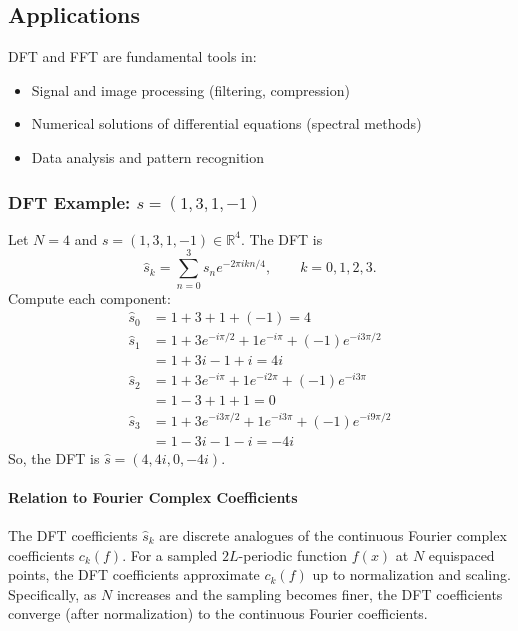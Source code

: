 \subsection{Applications}
DFT and FFT are fundamental tools in:
\begin{itemize}
    \item Signal and image processing (filtering, compression)
    \item Numerical solutions of differential equations (spectral methods)
    \item Data analysis and pattern recognition
\end{itemize}


\subsubsection*{DFT Example: $s = (1, 3, 1, -1)$}

Let $N = 4$ and $s = (1, 3, 1, -1) \in \mathbb{R}^4$. The DFT is
\[
    \hat{s}_k = \sum_{n=0}^{3} s_n e^{-2\pi i k n / 4}, \qquad k = 0,1,2,3.
\]
Compute each component:
\begin{align*}
    \hat{s}_0 & = 1 + 3 + 1 + (-1) = 4                                  \\
    \hat{s}_1 & = 1 + 3 e^{-i\pi/2} + 1 e^{-i\pi} + (-1) e^{-i3\pi/2}   \\
              & = 1 + 3i - 1 + i = 4i                                   \\
    \hat{s}_2 & = 1 + 3 e^{-i\pi} + 1 e^{-i2\pi} + (-1) e^{-i3\pi}      \\
              & = 1 - 3 + 1 + 1 = 0                                     \\
    \hat{s}_3 & = 1 + 3 e^{-i3\pi/2} + 1 e^{-i3\pi} + (-1) e^{-i9\pi/2} \\
              & = 1 - 3i - 1 - i = -4i
\end{align*}
So, the DFT is $\hat{s} = (4, 4i, 0, -4i)$.

\paragraph{Relation to Fourier Complex Coefficients}
The DFT coefficients $\hat{s}_k$ are discrete analogues of the continuous Fourier complex coefficients $c_k(f)$. For a sampled $2L$-periodic function $f(x)$ at $N$ equispaced points, the DFT coefficients approximate $c_k(f)$ up to normalization and scaling. Specifically, as $N$ increases and the sampling becomes finer, the DFT coefficients converge (after normalization) to the continuous Fourier coefficients.

